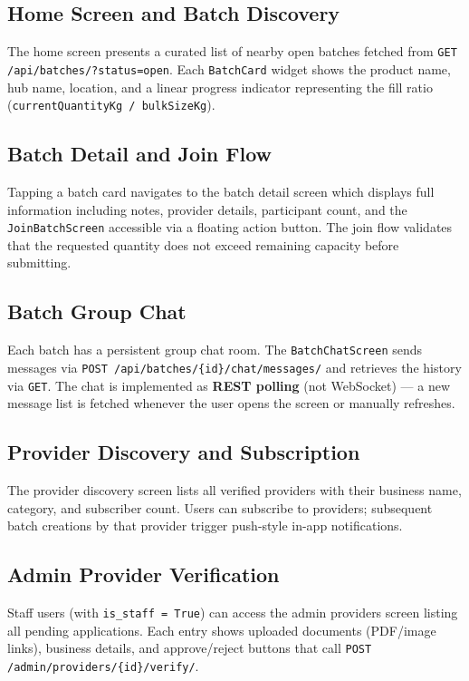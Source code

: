 \documentclass[12pt, a4paper]{report}
\begin{document}
\subsection{Home Screen and Batch Discovery}
The home screen presents a curated list of nearby open batches fetched from \texttt{GET /api/batches/?status=open}. Each \texttt{BatchCard} widget shows the product name, hub name, location, and a linear progress indicator representing the fill ratio (\texttt{currentQuantityKg / bulkSizeKg}).

\subsection{Batch Detail and Join Flow}
Tapping a batch card navigates to the batch detail screen which displays full information including notes, provider details, participant count, and the \texttt{JoinBatchScreen} accessible via a floating action button. The join flow validates that the requested quantity does not exceed remaining capacity before submitting.

\subsection{Batch Group Chat}
Each batch has a persistent group chat room. The \texttt{BatchChatScreen} sends messages via \texttt{POST /api/batches/\{id\}/chat/messages/} and retrieves the history via \texttt{GET}. The chat is implemented as \textbf{REST polling} (not WebSocket) --- a new message list is fetched whenever the user opens the screen or manually refreshes.

\subsection{Provider Discovery and Subscription}
The provider discovery screen lists all verified providers with their business name, category, and subscriber count. Users can subscribe to providers; subsequent batch creations by that provider trigger push-style in-app notifications.

\subsection{Admin Provider Verification}
Staff users (with \texttt{is\_staff = True}) can access the admin providers screen listing all pending applications. Each entry shows uploaded documents (PDF/image links), business details, and approve/reject buttons that call \texttt{POST /admin/providers/\{id\}/verify/}.
\end{document}
